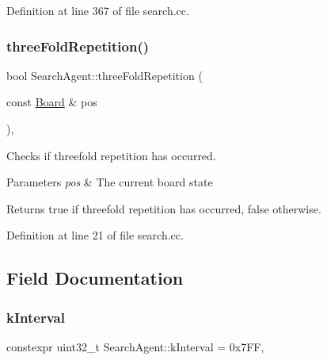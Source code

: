 Definition at line 367 of file search.\+cc.

\mbox{\label{classSearchAgent_acaf7ae2df02a071a23e6db4fbbdc7d99}} 
\subsubsection{\texorpdfstring{three\+Fold\+Repetition()}{threeFoldRepetition()}}
{\footnotesize\ttfamily bool Search\+Agent\+::three\+Fold\+Repetition (\begin{DoxyParamCaption}\item[{const \mbox{\hyperlink{classBoard}{Board}} \&}]{pos }\end{DoxyParamCaption})\hspace{0.3cm}{\ttfamily [private]}, {\ttfamily [noexcept]}}



Checks if threefold repetition has occurred. 


\begin{DoxyParams}{Parameters}
{\em pos} & The current board state \\
\hline
\end{DoxyParams}
\begin{DoxyReturn}{Returns}
true if threefold repetition has occurred, false otherwise. 
\end{DoxyReturn}


Definition at line 21 of file search.\+cc.



\subsection{Field Documentation}
\mbox{\label{classSearchAgent_ac040d91cab3fb103bce31d669d2bba47}} 
\subsubsection{\texorpdfstring{k\+Interval}{kInterval}}
{\footnotesize\ttfamily constexpr uint32\+\_\+t Search\+Agent\+::k\+Interval = 0x7\+FF\hspace{0.3cm}{\ttfamily [static]}, {\ttfamily [private]}}

